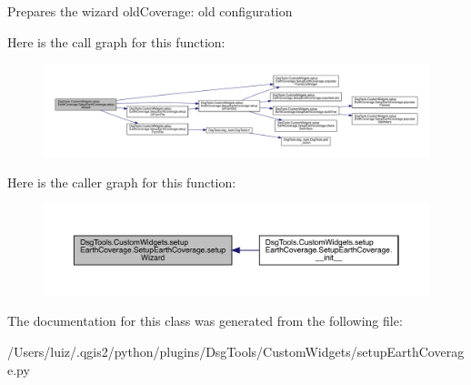 \begin{DoxyVerb}Prepares the wizard
oldCoverage: old configuration
\end{DoxyVerb}
 Here is the call graph for this function\+:
\nopagebreak
\begin{figure}[H]
\begin{center}
\leavevmode
\includegraphics[width=350pt]{class_dsg_tools_1_1_custom_widgets_1_1setup_earth_coverage_1_1_setup_earth_coverage_adec163acc8b4756dbc6b413989abb26b_cgraph}
\end{center}
\end{figure}
Here is the caller graph for this function\+:
\nopagebreak
\begin{figure}[H]
\begin{center}
\leavevmode
\includegraphics[width=350pt]{class_dsg_tools_1_1_custom_widgets_1_1setup_earth_coverage_1_1_setup_earth_coverage_adec163acc8b4756dbc6b413989abb26b_icgraph}
\end{center}
\end{figure}


The documentation for this class was generated from the following file\+:\begin{DoxyCompactItemize}
\item 
/\+Users/luiz/.\+qgis2/python/plugins/\+Dsg\+Tools/\+Custom\+Widgets/setup\+Earth\+Coverage.\+py\end{DoxyCompactItemize}
